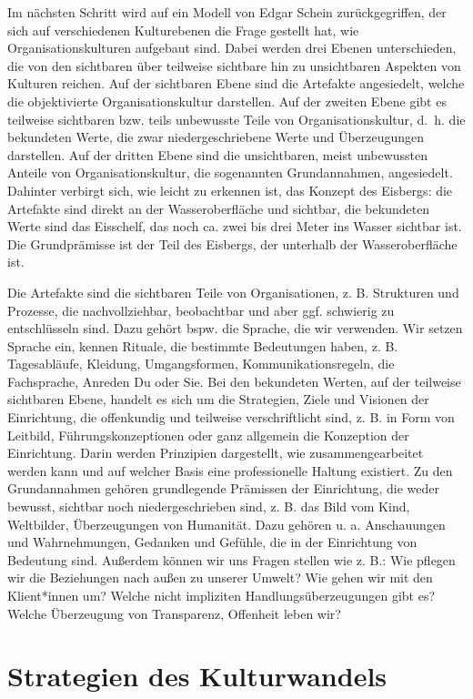 \documentclass[
  letterpaper,
]{book}
\begin{document}
Im nächsten Schritt wird auf ein Modell von Edgar Schein
zurückgegriffen, der sich auf verschiedenen Kulturebenen die Frage
gestellt hat, wie Organisationskulturen aufgebaut sind. Dabei werden
drei Ebenen unterschieden, die von den sichtbaren über teilweise
sichtbare hin zu unsichtbaren Aspekten von Kulturen reichen. Auf der
sichtbaren Ebene sind die Artefakte angesiedelt, welche die
objektivierte Organisationskultur darstellen. Auf der zweiten Ebene gibt
es teilweise sichtbaren bzw. teils unbewusste Teile von
Organisationskultur, d.~h. die bekundeten Werte, die zwar
niedergeschriebene Werte und Überzeugungen darstellen. Auf der dritten
Ebene sind die unsichtbaren, meist unbewussten Anteile von
Organisationskultur, die sogenannten Grundannahmen, angesiedelt.
Dahinter verbirgt sich, wie leicht zu erkennen ist, das Konzept des
Eisbergs: die Artefakte sind direkt an der Wasseroberfläche und
sichtbar, die bekundeten Werte sind das Eisschelf, das noch ca. zwei bis
drei Meter ins Wasser sichtbar ist. Die Grundprämisse ist der Teil des
Eisbergs, der unterhalb der Wasseroberfläche ist.

Die Artefakte sind die sichtbaren Teile von Organisationen, z. B.
Strukturen und Prozesse, die nachvollziehbar, beobachtbar und aber ggf.
schwierig zu entschlüsseln sind. Dazu gehört bspw. die Sprache, die wir
verwenden. Wir setzen Sprache ein, kennen Rituale, die bestimmte
Bedeutungen haben, z. B. Tagesabläufe, Kleidung, Umgangsformen,
Kommunikationsregeln, die Fachsprache, Anreden Du oder Sie. Bei den
bekundeten Werten, auf der teilweise sichtbaren Ebene, handelt es sich
um die Strategien, Ziele und Visionen der Einrichtung, die offenkundig
und teilweise verschriftlicht sind, z. B. in Form von Leitbild,
Führungskonzeptionen oder ganz allgemein die Konzeption der Einrichtung.
Darin werden Prinzipien dargestellt, wie zusammengearbeitet werden kann
und auf welcher Basis eine professionelle Haltung existiert. Zu den
Grundannahmen gehören grundlegende Prämissen der Einrichtung, die weder
bewusst, sichtbar noch niedergeschrieben sind, z. B. das Bild vom Kind,
Weltbilder, Überzeugungen von Humanität. Dazu gehören u. a. Anschauungen
und Wahrnehmungen, Gedanken und Gefühle, die in der Einrichtung von
Bedeutung sind. Außerdem können wir uns Fragen stellen wie z. B.: Wie
pflegen wir die Beziehungen nach außen zu unserer Umwelt? Wie gehen wir
mit den Klient*innen um? Welche nicht impliziten Handlungsüberzeugungen
gibt es? Welche Überzeugung von Transparenz, Offenheit leben wir?

\section{Strategien des
Kulturwandels}\label{strategien-des-kulturwandels}
\end{document}
